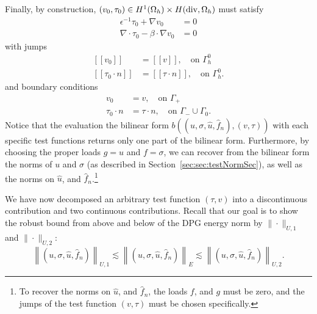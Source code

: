 \documentclass[11pt,onecolumn]{scrartcl}
\newcommand{\secref}[1]{\ref{sec:#1}}
\newcommand{\LRs}[1]{\left[ #1 \right]}
\newcommand{\jump}[1] {\ensuremath{\LRs{\![#1]\!}}}
\newcommand{\Gh}{\Gamma_h}
\newcommand{\Oh}{\Omega_h}
\newcommand{\grad}{\nabla}
\renewcommand{\div}{\grad \cdot}
\begin{document}
Finally, by construction, $\left(v_0,\tau_0\right) \in H^1(\Oh) \times H({\rm div},\Oh)$ must satisfy 
\begin{align*}
\epsilon^{-1}\tau_0 + \grad v_0 &= 0\\
\div \tau_0 - \beta\cdot \grad v_0 &= 0
\end{align*}
with jumps
\begin{align*}
\jump{v_0} &= \jump{v}, \quad \text{on }\Gh^0\\
\jump{\tau_0 \cdot n} &= \jump{\tau \cdot n}, \quad \text{on }\Gh^0.
\end{align*}
and boundary conditions
\begin{align*}
v_0 &= v, \quad \text{on } \Gamma_+ \\
\tau_0 \cdot n &= \tau \cdot n, \quad \text{on } \Gamma_-\cup \Gamma_0. 
\end{align*}
Notice that the evaluation the bilinear form $b\left(\left(u,\sigma,\widehat{u},\widehat{f}_n\right),\left(v,\tau\right)\right)$ with each specific test functions returns only one part of the bilinear form. Furthermore, by choosing the proper loads $g = u$ and $f=\sigma$, we can recover from the bilinear form the norms of $u$ and $\sigma$ (as described in Section~\secref{sec:testNormSec}), as well as the norms on $\widehat{u}$, and $\widehat{f}_n$.\footnote{To recover the norms on $\widehat{u}$, and $\widehat{f}_n$, the loads $f$, and $g$ must be zero, and the jumps of the test function $(v,\tau)$ must be chosen specifically.}

We have now decomposed an arbitrary test function $\left(\tau,v\right)$ into a discontinuous contribution and two continuous contributions.  Recall that our goal is to show the robust bound from above and below of the DPG energy norm by $\|\cdot \|_{U,1}$ and $\|\cdot \|_{U,2}$:
\[
\left\| \left(u,\sigma,\widehat{u},\widehat{f}_n\right)\right \|_{U,1} \lesssim  \left\| \left(u,\sigma,\widehat{u},\widehat{f}_n\right)\right \|_E \lesssim \left\| \left(u,\sigma,\widehat{u},\widehat{f}_n\right)\right \|_{U,2}.
\]
\end{document}
